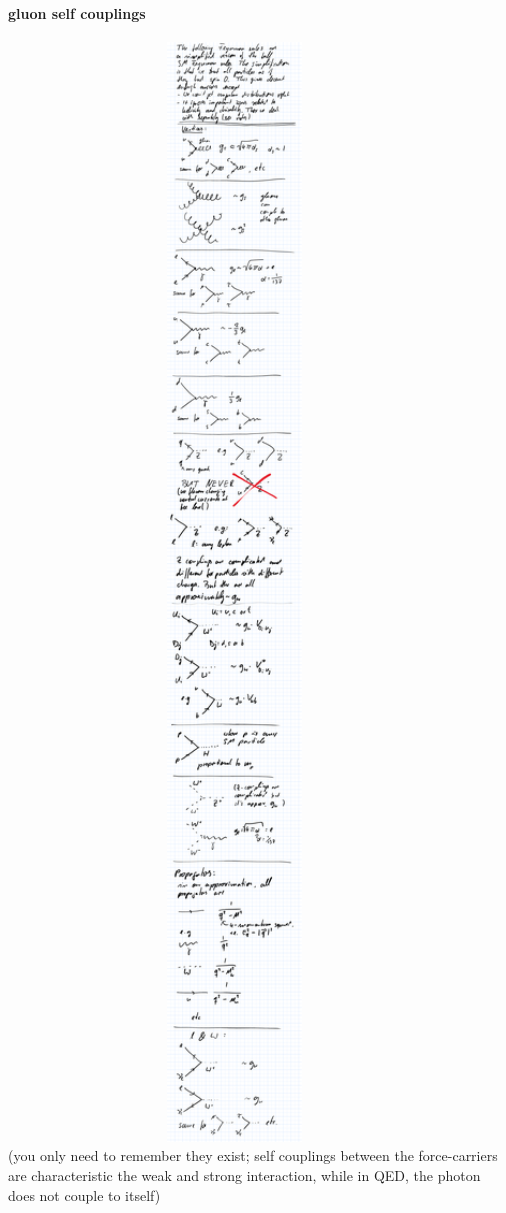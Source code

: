 \paragraph{gluon self couplings\\}
\includegraphics[width=0.9\textwidth]{fig/summary/F_gg}\\
(you only need to remember they exist; self couplings between the force-carriers are characteristic the weak and strong interaction, while in QED, the photon does not couple to itself)

